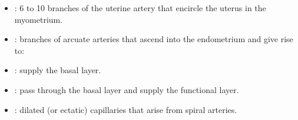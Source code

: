 \begin{multicols}{2}
\begin{itemize}
  \item {}:  6 to 10 branches of the uterine artery that encircle the uterus in the myometrium.
  
  \begin{center}
  \end{center}
  
  \item {}:  branches of arcuate arteries that ascend into the endometrium and give rise to: 
  
  \begin{center}
  \end{center}
  
  \item {}: supply the basal layer.
  
  \begin{center}
  \end{center}
  
  \item {}: pass through the basal layer and supply the functional layer. 
  
  \begin{center}
  \end{center}
  
  \item {}:  dilated (or ectatic) capillaries that arise from spiral arteries.
  
  \begin{center}
  \end{center}
  
\end{itemize}
\end{multicols}

